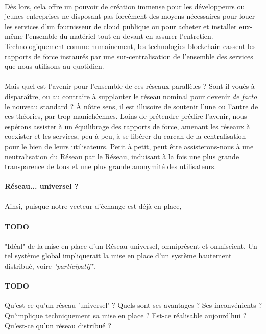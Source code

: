 \paragraph{} Dès lors, cela offre un pouvoir de création immense pour les développeurs ou jeunes entreprises ne disposant 
pas forcément des moyens nécessaires pour louer les services d'un fournisseur de cloud publique ou pour acheter et installer
eux-même l'ensemble du matériel tout en devant en assurer l'entretien. Technologiquement comme humainement, les technologies
blockchain cassent les rapports de force instaurés par une sur-centralisation de l'ensemble des services que nous utilisons
au quotidien.

\paragraph{} Mais quel est l'avenir pour l'ensemble de ces réseaux parallèles ? Sont-il voués à disparaître, ou au contraire
à supplanter le réseau nominal pour devenir \emph{de facto} le nouveau standard ? À nôtre sens, il est illusoire de soutenir
l'une ou l'autre de ces théories, par trop manichéennes. Loins de prétendre prédire l'avenir, nous espérons assister à un 
équilibrage des rapports de force, amenant les réseaux à coexister et les services, peu à peu, à se libérer du carcan de la
centralisation pour le bien de leurs utilisateurs. Petit à petit, peut être assisterons-nous à une neutralisation du Réseau
par le Réseau, induisant à la fois une plus grande transparence de tous et une plus grande anonymité des utilisateurs.


\paragraph{Réseau... universel ?}

\paragraph{} Ainsi, puisque notre vecteur d'échange est déjà en place, 

\paragraph{TODO} "Idéal" de la mise en place d'un Réseau universel, omniprésent
et omniscient. Un tel système global impliquerait la mise en place d'un système hautement
distribué, voire \emph{"participatif"}.

\paragraph{TODO} Qu'est-ce qu'un réseau 'universel' ? Quels sont ses avantages ? Ses inconvénients ?
Qu'implique techniquement sa mise en place ? Est-ce réalisable aujourd'hui ? Qu'est-ce qu'un réseau distribué ? 